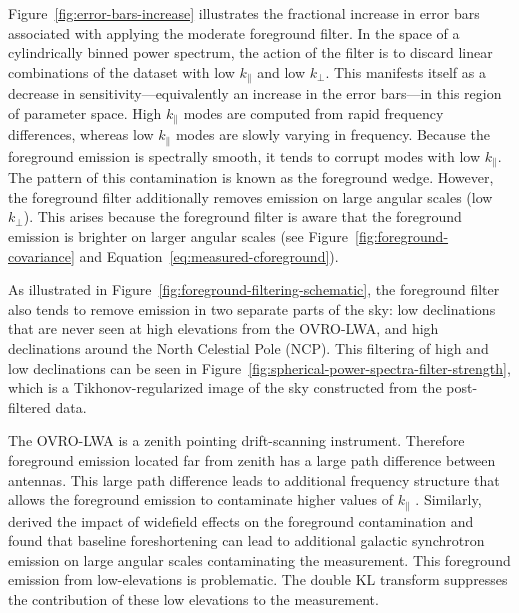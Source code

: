 \documentclass[twocolumn]{aastex62}
\begin{document}
Figure~\ref{fig:error-bars-increase} illustrates the fractional increase in error bars associated
with applying the moderate foreground filter. In the space of a cylindrically binned power spectrum,
the action of the filter is to discard linear combinations of the dataset with low $k_\parallel$ and
low $k_\perp$. This manifests itself as a decrease in sensitivity---equivalently an increase in the
error bars---in this region of parameter space.  High $k_\parallel$ modes are computed from rapid
frequency differences, whereas low $k_\parallel$ modes are slowly varying in frequency. Because the
foreground emission is spectrally smooth, it tends to corrupt modes with low $k_\parallel$. The
pattern of this contamination is known as the foreground wedge. However, the foreground filter
additionally removes emission on large angular scales (low $k_\perp$). This arises because the
foreground filter is aware that the foreground emission is brighter on larger angular scales (see
Figure~\ref{fig:foreground-covariance} and Equation~\ref{eq:measured-cforeground}).

As illustrated in Figure~\ref{fig:foreground-filtering-schematic}, the foreground filter also tends
to remove emission in two separate parts of the sky: low declinations that are never seen at high
elevations from the OVRO-LWA, and high declinations around the North Celestial Pole (NCP).  This
filtering of high and low declinations can be seen in
Figure~\ref{fig:spherical-power-spectra-filter-strength}, which is a Tikhonov-regularized image of
the sky constructed from the post-filtered data.

The OVRO-LWA is a zenith pointing drift-scanning instrument.  Therefore foreground emission located
far from zenith has a large path difference between antennas. This large path difference leads to
additional frequency structure that allows the foreground emission to contaminate higher values of
$k_\parallel$ \citep{2012ApJ...752..137M}.  Similarly, \citet{2015ApJ...804...14T} derived the
impact of widefield effects on the foreground contamination and found that baseline foreshortening
can lead to additional galactic synchrotron emission on large angular scales contaminating the
measurement. This foreground emission from low-elevations is problematic. The double KL transform
suppresses the contribution of these low elevations to the measurement.
\end{document}

